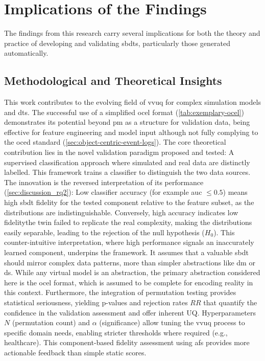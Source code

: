 \section{Implications of the Findings}
\label{sec:discussion_implications}

The findings from this research carry several implications for both the theory and practice of developing and validating \gls{sbdt}s, particularly those generated automatically.

\subsection{Methodological and Theoretical Insights}
\label{sec:implications_theoretical}

This work contributes to the evolving field of \gls{vvuq} for complex simulation models and \gls{dt}s. The successful use of a simplified \gls{ocel} format (\autoref{tab:exemplary-ocel}) demonstrates its potential beyond \gls{pm} as a structure for validation data, being effective for feature engineering and model input although not fully complying to the \gls{oced} standard (\autoref{sec:object-centric-event-logs}). The core theoretical contribution lies in the novel validation paradigm proposed and tested: A supervised classification approach where simulated and real data are distinctly labelled. This framework trains a classifier to distinguish the two data sources. The innovation is the reversed interpretation of its performance (\autoref{sec:discussion_rq2}): Low classifier accuracy (for example \gls{auc} $\le 0.5$) means high \gls{sbdt} fidelity for the tested component relative to the feature subset, as the distributions are indistinguishable. Conversely, high accuracy indicates low fidelity\textemdash the twin failed to replicate the real complexity, making the distributions easily separable, leading to the rejection of the null hypothesis ($H_0$). This counter-intuitive interpretation, where high performance signals an inaccurately learned component, underpins the framework. It assumes that a valuable \gls{sbdt} should mirror complex data patterns, more than simpler abstractions like \gls{dm} or \gls{ds}. While any virtual model is an abstraction, the primary abstraction considered here is the \gls{ocel} format, which is assumed to be complete for encoding reality in this context. Furthermore, the integration of permutation testing provides statistical seriousness, yielding p-values and rejection rates $RR$ that quantify the confidence in the validation assessment and offer inherent UQ. Hyperparameters $N$ (permutation count) and $\alpha$ (significance) allow tuning the \gls{vvuq} process to specific domain needs, enabling stricter thresholds where required (e.g., healthcare). This component-based fidelity assessment using \gls{afs} provides more actionable feedback than simple static scores.

